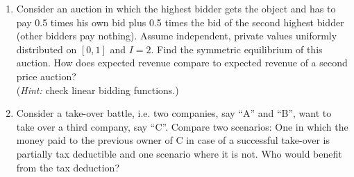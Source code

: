 \documentclass[a4paper,12pt]{article}
\begin{document}
\begin{enumerate}
\item Consider an auction in which the highest bidder gets the object and has to pay  0.5 times his own bid plus 0.5 times the bid of the second highest bidder (other bidders pay nothing). Assume independent, private values uniformly distributed on $[0,1]$ and $I=2$. Find the symmetric equilibrium of this auction. How does expected revenue compare to expected revenue of a second price auction?
  \\
  (\emph{Hint: }check linear bidding functions.)
\item Consider a take-over battle, i.e. two companies, say ``A'' and ``B'', want to take over a third company, say ``C''. Compare two scenarios: One in which the money paid to the previous owner of C in case of a successful take-over is partially tax deductible and one scenario where it is not. Who would benefit from the tax deduction?

\end{enumerate}
\end{document}
